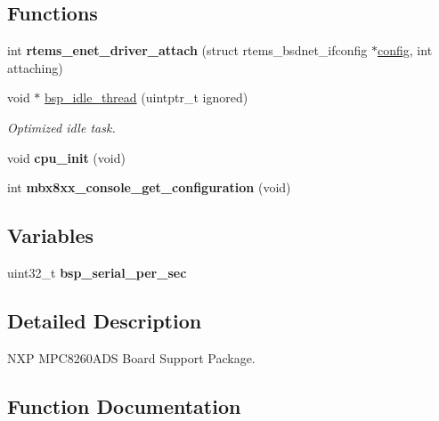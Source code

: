 \subsection*{Functions}
\begin{DoxyCompactItemize}
\item 
\mbox{\label{group__RTEMSBSPsPowerPCMPC8260ADS_ga0780e5386bc875c130908f58d337e5d9}} 
int {\bfseries rtems\+\_\+enet\+\_\+driver\+\_\+attach} (struct rtems\+\_\+bsdnet\+\_\+ifconfig $\ast$\mbox{\hyperlink{structconfig__s}{config}}, int attaching)
\item 
void $\ast$ \mbox{\hyperlink{group__RTEMSBSPsPowerPCMPC8260ADS_ga301be7085b80c41a9c5887247003c662}{bsp\+\_\+idle\+\_\+thread}} (uintptr\+\_\+t ignored)
\begin{DoxyCompactList}\small\item\em Optimized idle task. \end{DoxyCompactList}\item 
\mbox{\label{group__RTEMSBSPsPowerPCMPC8260ADS_ga560ad8614ae03841a10b489f4370bc51}} 
void {\bfseries cpu\+\_\+init} (void)
\item 
\mbox{\label{group__RTEMSBSPsPowerPCMPC8260ADS_gaf263dd0a3978e2b8bc5dd00a102eb1fb}} 
int {\bfseries mbx8xx\+\_\+console\+\_\+get\+\_\+configuration} (void)
\end{DoxyCompactItemize}
\subsection*{Variables}
\begin{DoxyCompactItemize}
\item 
\mbox{\label{group__RTEMSBSPsPowerPCMPC8260ADS_gabe82908144f34cc81ab790f6ed06886f}} 
uint32\+\_\+t {\bfseries bsp\+\_\+serial\+\_\+per\+\_\+sec}
\end{DoxyCompactItemize}


\subsection{Detailed Description}
N\+XP M\+P\+C8260\+A\+DS Board Support Package. 



\subsection{Function Documentation}
\mbox{\label{group__RTEMSBSPsPowerPCMPC8260ADS_ga301be7085b80c41a9c5887247003c662}} 
